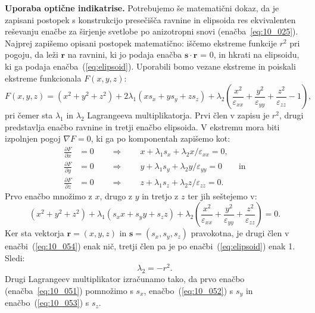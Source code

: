 \begin{example}{\bf Uporaba optične indikatrise.}
Potrebujemo še matematični dokaz, da je zapisani postopek s konstrukcijo presečišča 
ravnine in elipsoida res ekvivalenten reševanju enačbe za širjenje svetlobe 
po anizotropni snovi (enačba~\ref{eq:10_025}). Najprej zapišemo opisani postopek
matematično: iščemo ekstreme funkcije $r^2$ pri pogoju, da leži $\mathbf{r}$
na ravnini, ki jo podaja enačba $\mathbf{s}\cdot \mathbf{r}$ = 0, in hkrati
na elipsoidu, ki ga podaja enačba~(\ref{eq:elipsoid}). Uporabili bomo vezane ekstreme
in poiskali ekstreme funkcionala $F(x,y,z)$:
\begin{equation}
F(x,y,z) = (x^2+y^2+z^2) + 2 \lambda_1 (xs_x+ys_y+zs_z) + \lambda_2
\left(\frac{x^2}{\varepsilon_{xx}}+ \frac{y^2}{\varepsilon_{yy}}+
\frac{z^2}{\varepsilon_{zz}} -1 \right)\!\!,
\label{eq:10_050}
\end{equation}
pri čemer sta $\lambda_1$ in $\lambda_2$ Lagrangeeva multiplikatorja. Prvi člen
v zapisu je $r^2$, drugi predstavlja enačbo ravnine in tretji enačbo elipsoida.
V ekstremu mora biti izpolnjen pogoj $\nabla F = 0$, ki ga po komponentah zapišemo kot:
\begin{align}
\frac{\partial F}{\partial x} &= 0 \qquad \Longrightarrow 
\qquad x + \lambda_1 s_x + \lambda_2 x/\varepsilon_{xx}=0, \label{eq:10_051}\\
\frac{\partial F}{\partial y} &= 0 \qquad \Longrightarrow 
\qquad y + \lambda_1 s_y + \lambda_2 y/\varepsilon_{yy}=0 \qquad \mathrm{in}\label{eq:10_052}\\
\frac{\partial F}{\partial z} &= 0 \qquad \Longrightarrow 
\qquad z + \lambda_1 s_z + \lambda_2 z/\varepsilon_{zz}=0. \label{eq:10_053}
\end{align}
Prvo enačbo množimo z $x$, drugo z $y$ in tretjo z $z$ ter jih seštejemo v:
\begin{equation}
\left(x^2+y^2+z^2 \right) + \lambda_1 \left(s_xx+s_yy+s_zz \right) + \lambda_2 
\left( \frac{x^2}{\varepsilon_{xx}} + \frac{y^2}{\varepsilon_{yy}} + 
\frac{z^2}{\varepsilon_{zz}} \right) = 0.
\label{eq:10_054}
\end{equation}
Ker sta vektorja $\mathbf{r} = (x,y,z)$ in $\mathbf{s} = (s_x, s_y, s_z)$ pravokotna, 
je drugi člen v enačbi~(\ref{eq:10_054}) enak nič, tretji člen pa je po 
enačbi~(\ref{eq:elipsoid}) enak 1. Sledi: 
\begin{equation}
\lambda_2 = -r^2.
\label{eq:10_055}
\end{equation}
Drugi Lagrangeev multiplikator izračunamo tako, da prvo enačbo (enačba~\ref{eq:10_051}) pomnožimo s 
$s_x$, enačbo~(\ref{eq:10_052}) s $s_y$ in enačbo~(\ref{eq:10_053}) s $s_z$. 

\end{example}
